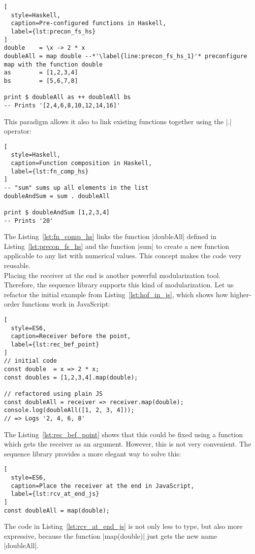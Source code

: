 \begin{lstlisting}[
  style=Haskell,
  caption=Pre-configured functions in Haskell,
  label={lst:precon_fs_hs}
]
double    = \x -> 2 * x
doubleAll = map double --*'\label{line:precon_fs_hs_1}'* preconfigure map with the function double
as        = [1,2,3,4]
bs        = [5,6,7,8]

print $ doubleAll as ++ doubleAll bs
-- Prints '[2,4,6,8,10,12,14,16]'
\end{lstlisting}

This paradigm allows it also to link existing functions together using the |.|
operator:

\begin{lstlisting}[
  style=Haskell,
  caption=Function composition in Haskell,
  label={lst:fn_comp_hs}
]
-- "sum" sums up all elements in the list
doubleAndSum = sum . doubleAll

print $ doubleAndSum [1,2,3,4]
-- Prints '20'
\end{lstlisting}

The Listing~\ref{lst:fn_comp_hs} links the function |doubleAll| defined in
Listing~\ref{lst:precon_fs_hs} and the function |sum| to create a new function
applicable to any list with numerical values. This concept makes the code very
reusable.\\
Placing the receiver at the end is another powerful modularization
tool. Therefore, the sequence library supports this kind of modularization.
Let us refactor the initial example from Listing~\ref{lst:hof_in_js}, which 
shows how higher-order functions work in JavaScript:
\begin{lstlisting}[
  style=ES6,
  caption=Receiver before the point,
  label={lst:rec_bef_point}
]
// initial code
const double  = x => 2 * x;
const doubles = [1,2,3,4].map(double);

// refactored using plain JS
const doubleAll = receiver => receiver.map(double);
console.log(doubleAll([1, 2, 3, 4]));
// => Logs '2, 4, 6, 8'
\end{lstlisting}

The Listing~\ref{lst:rec_bef_point} shows that this could be fixed using a
function which gets the receiver as an argument. However, this is not very
convenient. The sequence library provides a more elegant way to solve this:

\begin{lstlisting}[
  style=ES6,
  caption=Place the receiver at the end in JavaScript,
  label={lst:rcv_at_end_js}
]
const doubleAll = map(double);
\end{lstlisting}

The code in Listing~\ref{lst:rcv_at_end_js} is not only less to type, but also
more expressive, because the function |map(double)| just gets the new name
|doubleAll|.

